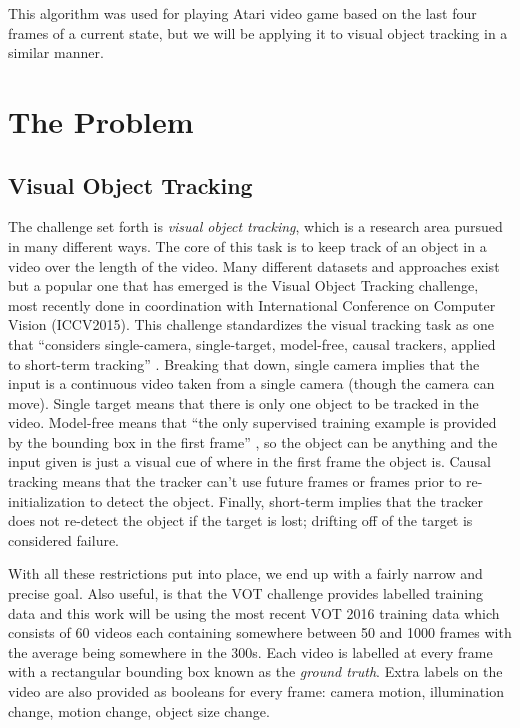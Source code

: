 \documentclass[letterpaper,12pt,titlepage,oneside,final]{book}
\begin{document}
This algorithm was used for playing Atari video game based on the last four frames of a current state, but we will be applying it to visual object tracking in a similar manner.


\chapter{The Problem}
\section{Visual Object Tracking}
The challenge set forth is \textit{visual object tracking}, which is a research area pursued in many different ways. The core of this task is to keep track of an object in a video over the length of the video. Many different datasets and approaches exist but a popular one that has emerged is the Visual Object Tracking challenge, most recently done in coordination with International Conference on Computer Vision (ICCV2015). This challenge standardizes the visual tracking task as one that ``considers single-camera, single-target, model-free, causal trackers, applied to short-term tracking'' \cite{vot2015}. Breaking that down, single camera implies that the input is a continuous video taken from a single camera (though the camera can move). Single target means that there is only one object to be tracked in the video. Model-free means that ``the only supervised training example is provided by the bounding box in the first frame'' \cite{vot2015}, so the object can be anything and the input given is just a visual cue of where in the first frame the object is. Causal tracking means that the tracker can't use future frames or frames prior to re-initialization to detect the object. Finally, short-term implies that the tracker does not re-detect the object if the target is lost; drifting off of the target is considered failure.


With all these restrictions put into place, we end up with a fairly narrow and precise goal. Also useful, is that the VOT challenge provides labelled training data and this work will be using the most recent VOT 2016 training data which consists of 60 videos each containing somewhere between 50 and 1000 frames with the average being somewhere in the 300s. Each video is labelled at every frame with a rectangular bounding box known as the \textit{ground truth}. Extra labels on the video are also provided as booleans for every frame: camera motion, illumination change, motion change, object size change. 
\end{document}
